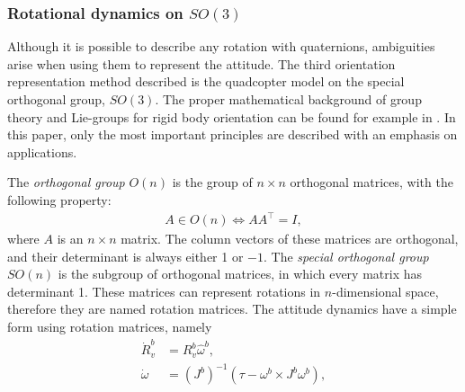 \subsubsection{Rotational dynamics on $SO(3)$}
Although it is possible to describe any rotation with quaternions, ambiguities arise when using them to represent the attitude. The third orientation representation method described is the quadcopter model on the special orthogonal group, $SO(3)$. The proper mathematical background of group theory and Lie-groups for rigid body orientation can be found for example in \cite{isidori1995nonlinear,Leethesis}. In this paper, only the most important principles are described with an emphasis on applications.

The\textit{ orthogonal group }$O(n)$ is the group of $n\times n$ orthogonal matrices, with the following property: 
\begin{align}
    A\in O(n) \Leftrightarrow AA^\top=I,
\end{align}
where $A$ is an $n\times n$ matrix. The column vectors of these matrices are orthogonal, and their determinant is always either 1 or $-1$. The\textit{ special orthogonal group} $SO(n)$ is the subgroup of orthogonal matrices, in which every matrix has determinant 1. These matrices can represent rotations in $n$-dimensional space, therefore they are named rotation matrices.
The attitude dynamics have a simple form using rotation matrices, namely
\begin{subequations}\label{eq:rot12}
   \begin{align}
    \dot{R}_v^b & = R_v^b\hat{\omega}^b,\label{eq:rot1}\\
    \dot{\omega} & = \left(J^b\right)^{-1}\left(\tau - \omega^b\times J^b \omega^b\right),\label{eq:rot2}
\end{align} 
\end{subequations}
